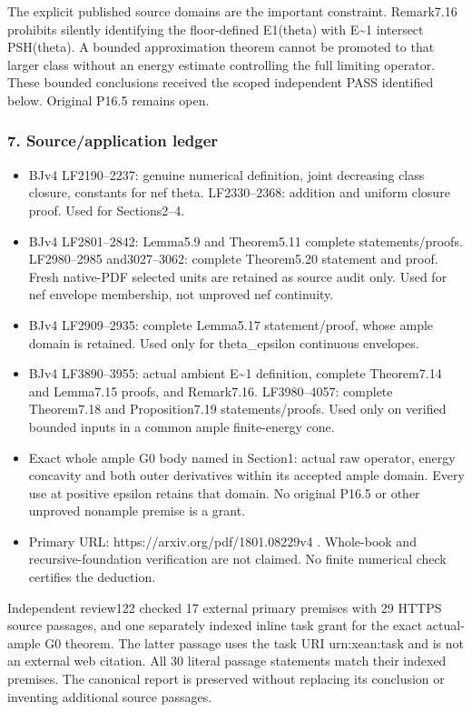 \documentclass[
]{article}
\providecommand{\tightlist}{%
  \setlength{\itemsep}{0pt}\setlength{\parskip}{0pt}}
\begin{document}
The explicit published source domains are the important constraint.
Remark7.16 prohibits silently identifying the floor-defined E1(theta)
with E\textasciitilde1 intersect PSH(theta). A bounded approximation
theorem cannot be promoted to that larger class without an energy
estimate controlling the full limiting operator. These bounded
conclusions received the scoped independent PASS identified below.
Original P16.5 remains open.

\subsubsection{7. Source/application
ledger}\label{sourceapplication-ledger}

\begin{itemize}
\tightlist
\item
  BJv4 LF2190--2237: genuine numerical definition, joint decreasing
  class closure, constants for nef theta. LF2330--2368: addition and
  uniform closure proof. Used for Sections2--4.
\item
  BJv4 LF2801--2842: Lemma5.9 and Theorem5.11 complete
  statements/proofs. LF2980--2985 and3027--3062: complete Theorem5.20
  statement and proof. Fresh native-PDF selected units are retained as
  source audit only. Used for nef envelope membership, not unproved nef
  continuity.
\item
  BJv4 LF2909--2935: complete Lemma5.17 statement/proof, whose ample
  domain is retained. Used only for theta\_epsilon continuous envelopes.
\item
  BJv4 LF3890--3955: actual ambient E\textasciitilde1 definition,
  complete Theorem7.14 and Lemma7.15 proofs, and Remark7.16.
  LF3980--4057: complete Theorem7.18 and Proposition7.19
  statements/proofs. Used only on verified bounded inputs in a common
  ample finite-energy cone.
\item
  Exact whole ample G0 body named in Section1: actual raw operator,
  energy concavity and both outer derivatives within its accepted ample
  domain. Every use at positive epsilon retains that domain. No original
  P16.5 or other unproved nonample premise is a grant.
\item
  Primary URL: https://arxiv.org/pdf/1801.08229v4 . Whole-book and
  recursive-foundation verification are not claimed. No finite numerical
  check certifies the deduction.
\end{itemize}

Independent review122 checked 17 external primary premises with 29 HTTPS
source passages, and one separately indexed inline task grant for the
exact actual-ample G0 theorem. The latter passage uses the task URI
urn:xean:task and is not an external web citation. All 30 literal
passage statements match their indexed premises. The canonical report is
preserved without replacing its conclusion or inventing additional
source passages.
\end{document}
